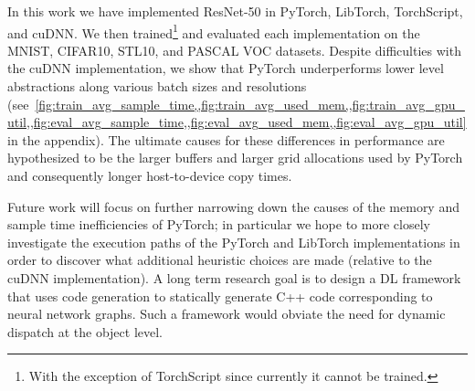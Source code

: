 In this work we have implemented ResNet-50 in PyTorch, LibTorch, TorchScript, and cuDNN.
We then trained\footnote{With the exception of TorchScript since currently it cannot be trained.} and evaluated each implementation on the MNIST, CIFAR10, STL10, and PASCAL VOC datasets.
Despite difficulties with the cuDNN implementation, we show that PyTorch underperforms lower level abstractions along various batch sizes and resolutions (see~\cref{fig:train_avg_sample_time,,fig:train_avg_used_mem,,fig:train_avg_gpu_util,,fig:eval_avg_sample_time,,fig:eval_avg_used_mem,,fig:eval_avg_gpu_util} in the appendix).
The ultimate causes for these differences in performance are hypothesized to be the larger buffers and larger grid allocations used by PyTorch and consequently longer host-to-device copy times.

Future work will focus on further narrowing down the causes of the memory and sample time inefficiencies of PyTorch;
in particular we hope to more closely investigate the execution paths of the PyTorch and LibTorch implementations in order to discover what additional heuristic choices are made (relative to the cuDNN implementation).
A long term research goal is to design a DL framework that uses code generation to statically generate C++ code corresponding to neural network graphs.
Such a framework would obviate the need for dynamic dispatch at the object level.